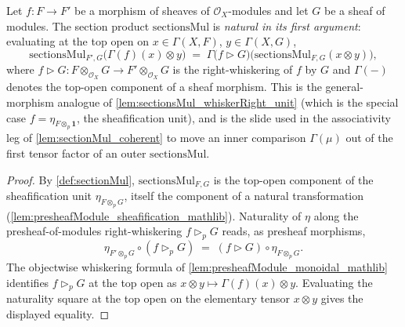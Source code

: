 \begin{lemma}

  \label{lem:sectionsMul_whiskerRight_natural}
  Let \(f : F \to F'\) be a morphism of sheaves of \(\mathcal{O}_X\)-modules and let
  \(G\) be a sheaf of modules. The section product \(\mathrm{sectionsMul}\) is
  \emph{natural in its first argument}: evaluating at the top open on
  \(x \in \Gamma(X,F)\), \(y \in \Gamma(X,G)\),
  \[
    \mathrm{sectionsMul}_{F',G}\bigl(\Gamma(f)(x) \otimes y\bigr)
      \;=\;
    \Gamma\bigl(f \rhd G\bigr)\bigl(\mathrm{sectionsMul}_{F,G}(x \otimes y)\bigr),
  \]
  where \(f \rhd G : F \otimes_{\mathcal{O}_X} G \to F' \otimes_{\mathcal{O}_X} G\) is
  the right-whiskering of \(f\) by \(G\) and \(\Gamma(-)\) denotes the top-open
  component of a sheaf morphism. This is the general-morphism analogue of
  \cref{lem:sectionsMul_whiskerRight_unit} (which is the special case
  \(f = \eta_{F \otimes_p \mathbf{1}}\), the sheafification unit), and is the slide
  used in the associativity leg of \cref{lem:sectionMul_coherent} to move an inner
  comparison \(\Gamma(\mu)\) out of the first tensor factor of an outer
  \(\mathrm{sectionsMul}\).
\end{lemma}

\begin{proof}
  \leanok

  By \cref{def:sectionMul}, \(\mathrm{sectionsMul}_{F,G}\) is the top-open component of
  the sheafification unit \(\eta_{F \otimes_{p} G}\), itself the component of a natural
  transformation (\cref{lem:presheafModule_sheafification_mathlib}). Naturality of
  \(\eta\) along the presheaf-of-modules right-whiskering \(f \rhd_p G\) reads, as
  presheaf morphisms,
  \[
    \eta_{F' \otimes_p G} \circ (f \rhd_p G)
      \;=\;
    (f \rhd G) \circ \eta_{F \otimes_p G}.
  \]
  The objectwise whiskering formula of \cref{lem:presheafModule_monoidal_mathlib}
  identifies \(f \rhd_p G\) at the top open as
  \(x \otimes y \mapsto \Gamma(f)(x) \otimes y\). Evaluating the naturality square at
  the top open on the elementary tensor \(x \otimes y\) gives the displayed equality.
\end{proof}

